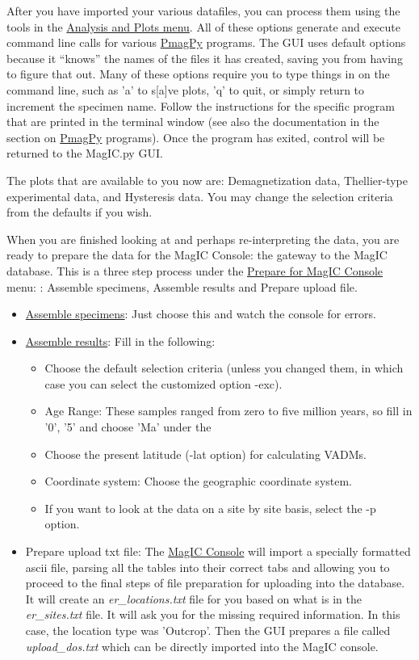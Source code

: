 \documentclass[11pt]{book}
\begin{document}
{{{After you have imported your various datafiles, you can process them using the tools in the \href{#AnalysisPlotsMenu}{Analysis and Plots menu}.    All of these options generate and execute command line calls for various \href{#PmagPy}{PmagPy} programs.  The GUI uses default options because it ``knows'' the names of the files it has created, saving you from having to figure that out.   Many of these options require you to type things in on the command line, such as 'a' to s[a]ve plots, 'q' to quit, or simply return to increment the specimen name.  Follow the instructions for the specific program that are printed  in the terminal window   (see also the documentation in the section on \href{#PmagPy}{PmagPy} programs). Once the program has exited, control will be returned to the MagIC.py GUI.  

The plots that are available to you now are:  Demagnetization data, Thellier-type experimental data, and Hysteresis data. 
You may change the selection criteria from the defaults if you wish.    

When you are finished looking at and perhaps re-interpreting the data, you are ready to prepare the data for the MagIC Console: the gateway to the MagIC database.  This is a three step process under the \href{#PrepareMagicConsole}{Prepare for MagIC Console} menu:
:  Assemble specimens, Assemble results and Prepare upload file.  \begin{itemize}
		\item \href{#PrepareMagicConsole}{Assemble specimens}:  Just choose this and watch the console for errors.  
		\item	\href{#PrepareMagicConsole}{Assemble results}:  Fill in the following: 
		\begin{itemize}
			\item Choose the default selection criteria (unless you changed them, in which case you can select the customized option  -exc).  
			\item Age Range: These samples ranged from zero to five million years, so fill in '0', '5' and choose 'Ma' under the 
			\item   Choose the present latitude (-lat option) for calculating VADMs.
	         \item Coordinate system:  Choose the geographic coordinate system.
	         \item If you want to look at the data on a site by site basis, select the -p option.
		\end{itemize}
		\item Prepare upload txt file:  The \href{#Uploading}{MagIC Console} will import a specially formatted ascii file, parsing all the tables into their correct tabs and allowing you to proceed to the final steps of file preparation for uploading into the database.   It will create an {\it er\_locations.txt} file for you based on what is in the {\it er\_sites.txt} file.  It will ask you for the missing required information.   In this case, the location type was 'Outcrop'.  Then the GUI prepares a file called {\it upload\_dos.txt} which can be directly imported into the MagIC console.   
\end{itemize}

}}}
\end{document}
